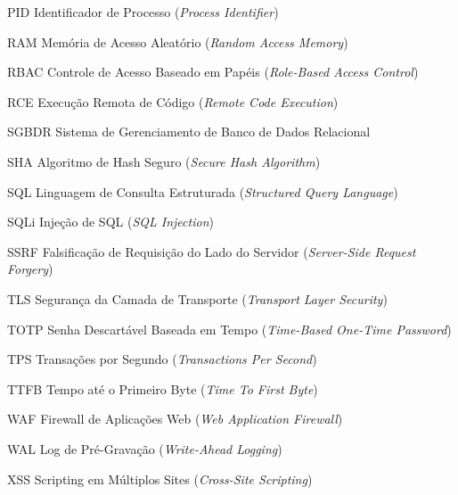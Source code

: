 \documentclass[
    12pt,               %
    oneside,            %
    a4paper,            %
    chapter=TITLE,      %
    section=TITLE,      %
    english,            %
    brazil,             %
    article             %
]{abntex2}
\begin{document}
\begin{siglas}
    \item[PID] Identificador de Processo (\textit{Process Identifier})
    \item[RAM] Memória de Acesso Aleatório (\textit{Random Access Memory})
    \item[RBAC] Controle de Acesso Baseado em Papéis (\textit{Role-Based Access Control})
    \item[RCE] Execução Remota de Código (\textit{Remote Code Execution})
    \item[SGBDR] Sistema de Gerenciamento de Banco de Dados Relacional
    \item[SHA] Algoritmo de Hash Seguro (\textit{Secure Hash Algorithm})
    \item[SQL] Linguagem de Consulta Estruturada (\textit{Structured Query Language})
    \item[SQLi] Injeção de SQL (\textit{SQL Injection})
    \item[SSRF] Falsificação de Requisição do Lado do Servidor (\textit{Server-Side Request Forgery})
    \item[TLS] Segurança da Camada de Transporte (\textit{Transport Layer Security})
    \item[TOTP] Senha Descartável Baseada em Tempo (\textit{Time-Based One-Time Password})
    \item[TPS] Transações por Segundo (\textit{Transactions Per Second})
    \item[TTFB] Tempo até o Primeiro Byte (\textit{Time To First Byte})
    \item[WAF] Firewall de Aplicações Web (\textit{Web Application Firewall})
    \item[WAL] Log de Pré-Gravação (\textit{Write-Ahead Logging})
    \item[XSS] Scripting em Múltiplos Sites (\textit{Cross-Site Scripting})
\end{siglas}

\tableofcontents*
\cleardoublepage


\begin{apresentacao}
    \imprimirapresentacao
\end{apresentacao}
\newpage

\imprimirpaginaresumos


\textual
\end{document}
